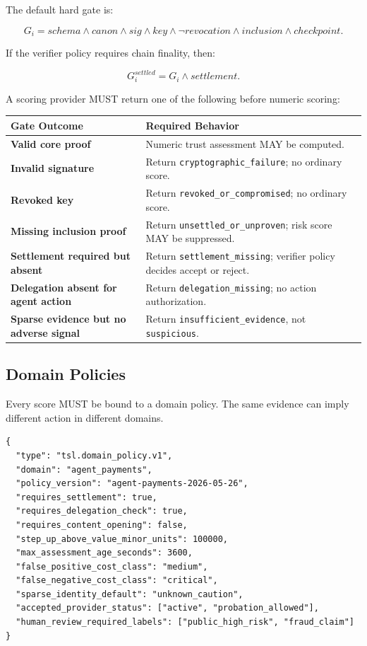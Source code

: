 \documentclass[11pt]{article}
\begin{document}
The default hard gate is:

\begin{equation}
G_i=schema\land canon\land sig\land key\land \neg revocation\land inclusion\land checkpoint.
\end{equation}

If the verifier policy requires chain finality, then:

\begin{equation}
G_i^{settled}=G_i\land settlement.
\end{equation}

A scoring provider MUST return one of the following before numeric scoring:

\begin{center}
\begin{tabularx}{\textwidth}{>{\bfseries}p{} X}
\toprule
Gate Outcome & Required Behavior \\
\midrule
Valid core proof & Numeric trust assessment MAY be computed. \\
Invalid signature & Return \texttt{cryptographic\_failure}; no ordinary score. \\
Revoked key & Return \texttt{revoked\_or\_compromised}; no ordinary score. \\
Missing inclusion proof & Return \texttt{unsettled\_or\_unproven}; risk score MAY be suppressed. \\
Settlement required but absent & Return \texttt{settlement\_missing}; verifier policy decides accept or reject. \\
Delegation absent for agent action & Return \texttt{delegation\_missing}; no action authorization. \\
Sparse evidence but no adverse signal & Return \texttt{insufficient\_evidence}, not \texttt{suspicious}. \\
\bottomrule
\end{tabularx}
\end{center}

\subsection{Domain Policies}

Every score MUST be bound to a domain policy. The same evidence can imply different action in different domains.

\begin{lstlisting}[style=tslcode]
{
  "type": "tsl.domain_policy.v1",
  "domain": "agent_payments",
  "policy_version": "agent-payments-2026-05-26",
  "requires_settlement": true,
  "requires_delegation_check": true,
  "requires_content_opening": false,
  "step_up_above_value_minor_units": 100000,
  "max_assessment_age_seconds": 3600,
  "false_positive_cost_class": "medium",
  "false_negative_cost_class": "critical",
  "sparse_identity_default": "unknown_caution",
  "accepted_provider_status": ["active", "probation_allowed"],
  "human_review_required_labels": ["public_high_risk", "fraud_claim"]
}
\end{lstlisting}
\end{document}
